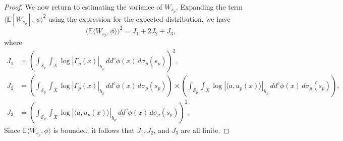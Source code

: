\documentclass[11pt,leqno,oneside]{amsart}
\numberwithin{equation}{section}
\begin{document}
\begin{proof}
 We now return to estimating the variance of \( W_{s_{p}} \). Expanding the term \( \langle \mathbb{E}[W_{s_{p}}], \, \phi \rangle^{2} \) using the expression for the expected distribution, we have
 \begin{equation*}
 	\big( \mathbb{E}\langle W_{s_{p}}, \phi \rangle \big)^{2} = J_{1} + 2 J_{2} + J_{3},
 \end{equation*}
 where
 \begin{align}
 	J_{1} &= \left( \int_{\mathcal{S}_{p}} \int_{X}{\log{|\Gamma_{p}(x)|_{h_{p}}} \, dd^{c}\phi(x) \, d\sigma_{p}(s_{p})} \right)^{2}, \label{J1} \\
 	J_{2} &= \left( \int_{\mathcal{S}_{p}} \int_{X}{\log{|\Gamma_{p}(x)|_{h_{p}}} \, dd^{c}\phi(x) \, d\sigma_{p}(s_{p})} \right) \times \left( \int_{\mathcal{S}_{p}} \int_{X}{\log{| \langle a, u_{p}(x)\rangle|_{h_{p}}} \, dd^{c}\phi(x) \, d\sigma_{p}(s_{p})} \right), \label{J2} \\
 	J_{3} &= \left( \int_{\mathcal{S}_{p}} \int_{X}{\log{| \langle a, u_{p}(x)\rangle|_{h_{p}}} \, dd^{c}\phi(x) \, d\sigma_{p}(s_{p})} \right)^{2}. \label{J3}
 \end{align}
 Since \( \mathbb{E}\langle W_{s_{p}}, \phi \rangle \) is bounded, it follows that \( J_{1}, J_{2} \), and \( J_{3} \) are all finite.


\end{proof}
\end{document}
